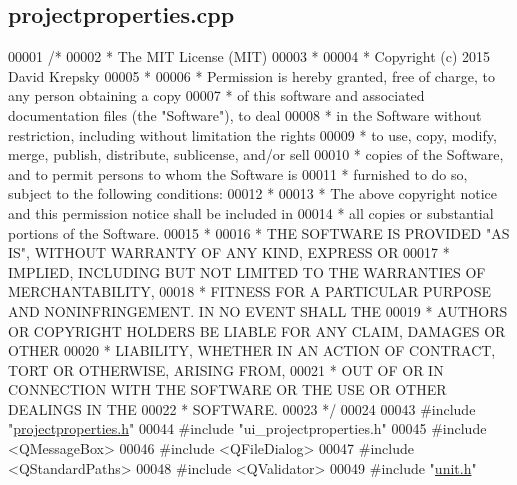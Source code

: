 \hypertarget{projectproperties_8cpp_source}{}\subsection{projectproperties.\+cpp}
\label{projectproperties_8cpp_source}

\begin{DoxyCode}
00001 \textcolor{comment}{/*}
00002 \textcolor{comment}{ * The MIT License (MIT)}
00003 \textcolor{comment}{ *}
00004 \textcolor{comment}{ * Copyright (c) 2015 David Krepsky}
00005 \textcolor{comment}{ *}
00006 \textcolor{comment}{ * Permission is hereby granted, free of charge, to any person obtaining a copy}
00007 \textcolor{comment}{ * of this software and associated documentation files (the "Software"), to deal}
00008 \textcolor{comment}{ * in the Software without restriction, including without limitation the rights}
00009 \textcolor{comment}{ * to use, copy, modify, merge, publish, distribute, sublicense, and/or sell}
00010 \textcolor{comment}{ * copies of the Software, and to permit persons to whom the Software is}
00011 \textcolor{comment}{ * furnished to do so, subject to the following conditions:}
00012 \textcolor{comment}{ *}
00013 \textcolor{comment}{ * The above copyright notice and this permission notice shall be included in}
00014 \textcolor{comment}{ * all copies or substantial portions of the Software.}
00015 \textcolor{comment}{ *}
00016 \textcolor{comment}{ * THE SOFTWARE IS PROVIDED "AS IS", WITHOUT WARRANTY OF ANY KIND, EXPRESS OR}
00017 \textcolor{comment}{ * IMPLIED, INCLUDING BUT NOT LIMITED TO THE WARRANTIES OF MERCHANTABILITY,}
00018 \textcolor{comment}{ * FITNESS FOR A PARTICULAR PURPOSE AND NONINFRINGEMENT. IN NO EVENT SHALL THE}
00019 \textcolor{comment}{ * AUTHORS OR COPYRIGHT HOLDERS BE LIABLE FOR ANY CLAIM, DAMAGES OR OTHER}
00020 \textcolor{comment}{ * LIABILITY, WHETHER IN AN ACTION OF CONTRACT, TORT OR OTHERWISE, ARISING FROM,}
00021 \textcolor{comment}{ * OUT OF OR IN CONNECTION WITH THE SOFTWARE OR THE USE OR OTHER DEALINGS IN THE}
00022 \textcolor{comment}{ * SOFTWARE.}
00023 \textcolor{comment}{ */}
00024 
00043 \textcolor{preprocessor}{#include "\hyperlink{projectproperties_8h}{projectproperties.h}"}
00044 \textcolor{preprocessor}{#include "ui\_projectproperties.h"}
00045 \textcolor{preprocessor}{#include <QMessageBox>}
00046 \textcolor{preprocessor}{#include <QFileDialog>}
00047 \textcolor{preprocessor}{#include <QStandardPaths>}
00048 \textcolor{preprocessor}{#include <QValidator>}
00049 \textcolor{preprocessor}{#include "\hyperlink{unit_8h}{unit.h}"}

\end{DoxyCode}

